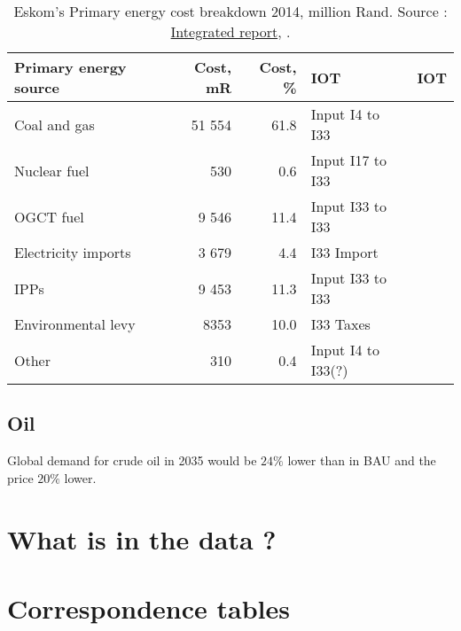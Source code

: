 \documentclass[12pt,english]{article}
\begin{document}
\begin{table}[ht]
	\centering
	\begin{tabular}{lrrlr}
		\toprule
		Primary energy source	& Cost, mR  & Cost, \% & IOT  & IOT\\ 
		\midrule
		Coal and gas & 51 554   &  61.8   & Input I4 to I33 &\\
		Nuclear  fuel &  530  &   0.6  & Input I17 to I33& \\
		OGCT fuel & 9 546   &   11.4   & Input I33 to I33  & \\
		Electricity  imports & 3 679   &  4.4  & I33 Import & \\
		IPPs &  9 453  &  11.3  & Input I33 to I33 & \\
		Environmental levy & 8353 &   10.0   & I33 Taxes & \\
		Other &  310  &  0.4  & Input I4 to I33(?) 	& \\
		\bottomrule
	\end{tabular}
	\caption{\label{EskomPrimaryEnergy}Eskom's Primary energy cost breakdown 2014, million Rand. Source : \href{http://www.eskom.co.za/IR2015/Documents/EskomIR2015single.pdf}{Integrated report}, \citep{Eskom2014AR}.}
\end{table}




\subsection{Oil}

Global demand for crude oil in 2035 would be $24\%$ lower than in BAU and the price $20\%$ lower. 




\clearpage

\newpage


\clearpage

\appendix

\section{What is in the data ?}



\section{Correspondence tables}
\end{document}
